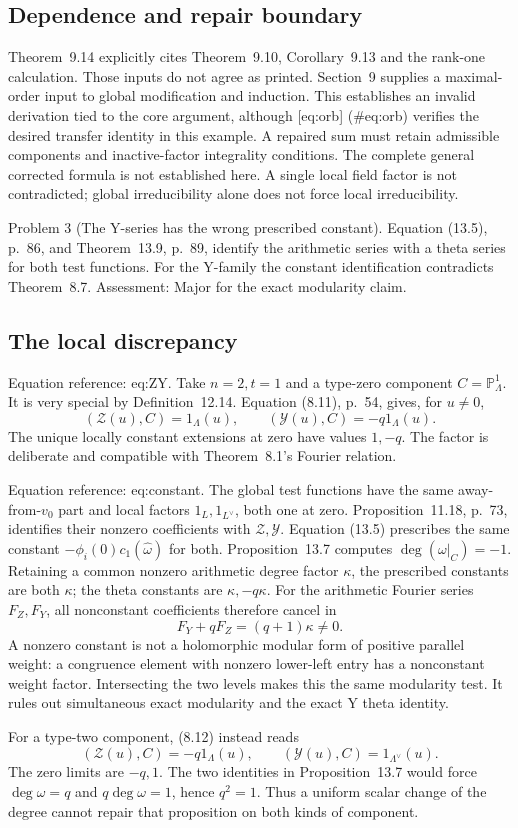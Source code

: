 \documentclass[10pt]{article}
\begin{document}
\subsection*{Dependence and repair boundary}
Theorem 9.14 explicitly cites Theorem 9.10, Corollary 9.13 and the rank-one calculation. Those inputs do not agree as printed. Section 9 supplies a maximal-order input to global modification and induction. This establishes an invalid derivation tied to the core argument, although [eq:orb] (\#eq:orb) verifies the desired transfer identity in this example. A repaired sum must retain admissible components and inactive-factor integrality conditions. The complete general corrected formula is not established here. A single local field factor is not contradicted; global irreducibility alone does not force local irreducibility.\par
Problem 3 (The Y-series has the wrong prescribed constant).  Equation (13.5), p. 86, and Theorem 13.9, p. 89, identify the arithmetic series with a theta series for both test functions. For the Y-family the constant identification contradicts Theorem 8.7. Assessment: Major for the exact modularity claim.\par
\subsection*{The local discrepancy}
Equation reference: eq:ZY. Take \(n=2,t=1\) and a type-zero component \(C=\mathbb P^1_\Lambda\). It is very special by Definition 12.14. Equation (8.11), p. 54, gives, for \(u\ne0\), \[
 (\mathcal Z(u),C)=1_\Lambda(u),\qquad
 (\mathcal Y(u),C)=-q1_\Lambda(u).\] The unique locally constant extensions at zero have values \(1,-q\). The factor is deliberate and compatible with Theorem 8.1’s Fourier relation.\par
Equation reference: eq:constant. The global test functions have the same away-from-\(v_0\) part and local factors \(1_L,1_{L^\vee}\), both one at zero. Proposition 11.18, p. 73, identifies their nonzero coefficients with \(\mathcal Z,\mathcal Y\). Equation (13.5) prescribes the same constant \(-\phi_i(0)c_1(\widehat\omega)\) for both. Proposition 13.7 computes \(\deg(\omega|_C)=-1\). Retaining a common nonzero arithmetic degree factor \(\kappa\), the prescribed constants are both \(\kappa\); the theta constants are \(\kappa,-q\kappa\). For the arithmetic Fourier series \(F_Z,F_Y\), all nonconstant coefficients therefore cancel in \[
 F_Y+qF_Z=(q+1)\kappa\ne0.\] A nonzero constant is not a holomorphic modular form of positive parallel weight: a congruence element with nonzero lower-left entry has a nonconstant weight factor. Intersecting the two levels makes this the same modularity test. It rules out simultaneous exact modularity and the exact Y theta identity.\par
For a type-two component, (8.12) instead reads \[(\mathcal Z(u),C)=-q1_\Lambda(u),\qquad
 (\mathcal Y(u),C)=1_{\Lambda^\vee}(u).\] The zero limits are \(-q,1\). The two identities in Proposition 13.7 would force \(\deg\omega=q\) and \(q\deg\omega=1\), hence \(q^2=1\). Thus a uniform scalar change of the degree cannot repair that proposition on both kinds of component.\par
\end{document}
